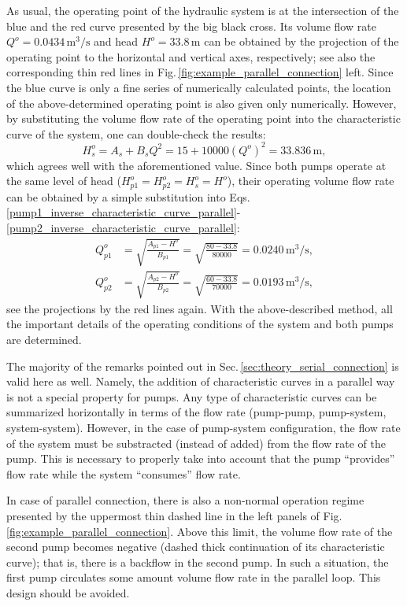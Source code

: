 As usual, the operating point of the hydraulic system is at the intersection of the blue and the red curve presented by the big black cross. Its volume flow rate $Q^o=0.0434\,\mathrm{m^3/s}$ and head $H^o=33.8\,\mathrm{m}$ can be obtained by the projection of the operating point to the horizontal and vertical axes, respectively; see also the corresponding thin red lines in Fig.\,\ref{fig:example_parallel_connection} left. Since the blue curve is only a fine series of numerically calculated points, the location of the above-determined operating point is also given only numerically. However, by substituting the volume flow rate of the operating point into the characteristic curve of the system, one can double-check the results:
%
\begin{equation}
H_s^o = A_s + B_s Q^2 = 15 + 10000 (Q^o)^2 = 33.836\,\mathrm{m},
\end{equation}
%
which agrees well with the aforementioned value. Since both pumps operate at the same level of head ($H_{p1}^o=H_{p2}^o=H_s^o=H^o$), their operating volume flow rate can be obtained by a simple substitution into Eqs.\,\eqref{pump1_inverse_characteristic_curve_parallel}-\eqref{pump2_inverse_characteristic_curve_parallel}:
%
\begin{align}
Q_{p1}^o &= \sqrt{ \frac{A_{p1}-H^o}{B_{p1}} } = \sqrt{ \frac{80-33.8}{80000} } = 0.0240\,\mathrm{m^3/s}, \\
Q_{p2}^o &= \sqrt{ \frac{A_{p2}-H^o}{B_{p2}} } = \sqrt{ \frac{60-33.8}{70000} } = 0.0193\,\mathrm{m^3/s},
\end{align}
%
see the projections by the red lines again. With the above-described method, all the important details of the operating conditions of the system and both pumps are determined.

The majority of the remarks pointed out in Sec.\,\ref{sec:theory_serial_connection} is valid here as well. Namely, the addition of characteristic curves in a parallel way is not a special property for pumps. Any type of characteristic curves can be summarized horizontally in terms of the flow rate (pump-pump, pump-system, system-system). However, in the case of pump-system configuration, the flow rate of the system must be substracted (instead of added) from the flow rate of the pump. This is necessary to properly take into account that the pump ``provides'' flow rate while the system ``consumes'' flow rate.

In case of parallel connection, there is also a non-normal operation regime presented by the uppermost thin dashed line in the left panels of Fig.\,\ref{fig:example_parallel_connection}. Above this limit, the volume flow rate of the second pump becomes negative (dashed thick continuation of its characteristic curve); that is, there is a backflow in the second pump. In such a situation, the first pump circulates some amount volume flow rate in the parallel loop. This design should be avoided.

